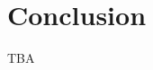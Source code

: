 \documentclass[11pt, a4paper]{article} %
\begin{document}
\section{Conclusion}
TBA


\printbibliography

\end{document}

